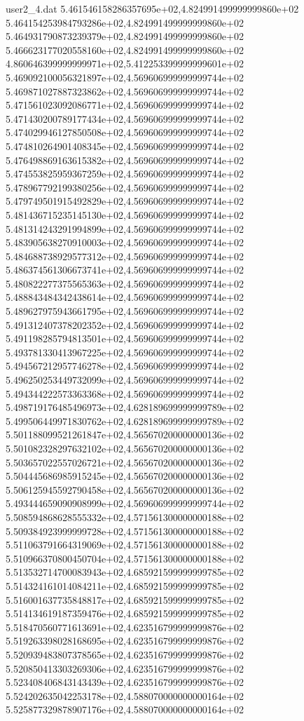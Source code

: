 \begin{filecontents}{user2_4.dat}
5.461546158286357695e+02,4.824991499999999860e+02
5.464154253984793286e+02,4.824991499999999860e+02
5.464931790873239379e+02,4.824991499999999860e+02
5.466623177020558160e+02,4.824991499999999860e+02
4.860646399999999971e+02,5.412253399999999601e+02
5.469092100056321897e+02,4.569606999999999744e+02
5.469871027887323862e+02,4.569606999999999744e+02
5.471561023092086771e+02,4.569606999999999744e+02
5.471430200789177434e+02,4.569606999999999744e+02
5.474029946127850508e+02,4.569606999999999744e+02
5.474810264901408345e+02,4.569606999999999744e+02
5.476498869163615382e+02,4.569606999999999744e+02
5.474553825959367259e+02,4.569606999999999744e+02
5.478967792199380256e+02,4.569606999999999744e+02
5.479749501915492829e+02,4.569606999999999744e+02
5.481436715235145130e+02,4.569606999999999744e+02
5.481314243291994899e+02,4.569606999999999744e+02
5.483905638270910003e+02,4.569606999999999744e+02
5.484688738929577312e+02,4.569606999999999744e+02
5.486374561306673741e+02,4.569606999999999744e+02
5.480822277375565363e+02,4.569606999999999744e+02
5.488843484342438614e+02,4.569606999999999744e+02
5.489627975943661795e+02,4.569606999999999744e+02
5.491312407378202352e+02,4.569606999999999744e+02
5.491198285794813501e+02,4.569606999999999744e+02
5.493781330413967225e+02,4.569606999999999744e+02
5.494567212957746278e+02,4.569606999999999744e+02
5.496250253449732099e+02,4.569606999999999744e+02
5.494344222573363368e+02,4.569606999999999744e+02
5.498719176485496973e+02,4.628189699999999789e+02
5.499506449971830762e+02,4.628189699999999789e+02
5.501188099521261847e+02,4.565670200000000136e+02
5.501082328297632102e+02,4.565670200000000136e+02
5.503657022557026721e+02,4.565670200000000136e+02
5.504445686985915245e+02,4.565670200000000136e+02
5.506125945592790458e+02,4.565670200000000136e+02
5.493444659090908999e+02,4.569606999999999744e+02
5.508594868628555332e+02,4.571561300000000188e+02
5.509384923999999728e+02,4.571561300000000188e+02
5.511063791664319069e+02,4.571561300000000188e+02
5.510966370800450704e+02,4.571561300000000188e+02
5.513532714700083943e+02,4.685921599999999785e+02
5.514324161014084211e+02,4.685921599999999785e+02
5.516001637735848817e+02,4.685921599999999785e+02
5.514134619187359476e+02,4.685921599999999785e+02
5.518470560771613691e+02,4.623516799999999876e+02
5.519263398028168695e+02,4.623516799999999876e+02
5.520939483807378565e+02,4.623516799999999876e+02
5.520850413303269306e+02,4.623516799999999876e+02
5.523408406843143439e+02,4.623516799999999876e+02
5.524202635042253178e+02,4.588070000000000164e+02
5.525877329878907176e+02,4.588070000000000164e+02

\end{filecontents}
